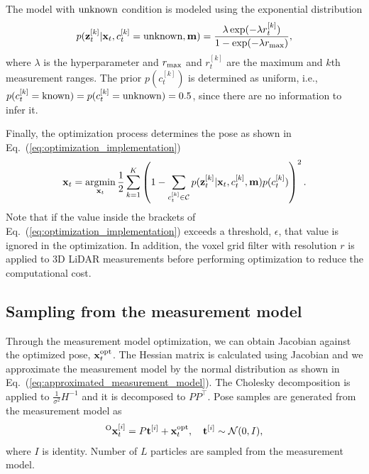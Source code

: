 \documentclass[letterpaper, 10 pt, conference]{ieeeconf}  %
\newcommand{\argmin}{\mathop{\rm argmin}\limits}
\begin{document}
The model with ${\rm unknown}$ condition is modeled using the exponential distribution
%
\begin{align}
    p({\bf z}_{t}^{[k]} | {\bf x}_{t}, c_{t}^{[k]} = {\rm unknown}, {\bf m}) = \frac{\lambda \exp(-\lambda r_{t}^{[k]})}{1 - \exp(-\lambda r_{\rm max})},
\end{align}
%
where $\lambda$ is the hyperparameter and $r_{\rm max}$ and $r_{t}^{[k]}$ are the maximum and $k$th measurement ranges.
The prior $p(c_{t}^{[k]})$ is determined as uniform, i.e., $p(c_{t}^{[k]} = {\rm known}) = p(c_{t}^{[k]} = {\rm unknown}) = 0.5$, since there are no information to infer it.

Finally, the optimization process determines the pose as shown in Eq.~(\ref{eq:optimization_implementation})
%
\begin{align}
    {\bf x}_{t} = \argmin_{{\bf x}_{t}} \frac{1}{2} \sum_{k=1}^{K} \left( 1 - \sum_{c_{t}^{[k]} \in \mathcal{C}} p({\bf z}_{t}^{[k]} | {\bf x}_{t}, c_{t}^{[k]}, {\bf m}) p(c_{t}^{[k]}) \right)^{2}.
    \label{eq:optimization_implementation}
\end{align}
%
Note that if the value inside the brackets of Eq.~(\ref{eq:optimization_implementation}) exceeds a threshold, $\epsilon$, that value is ignored in the optimization.
In addition, the voxel grid filter with resolution $r$ is applied to 3D LiDAR measurements before performing optimization to reduce the computational cost.



\subsection{Sampling from the measurement model}

Through the measurement model optimization, we can obtain Jacobian against the optimized pose, ${\bf x}_{t}^{{\rm opt}}$.
The Hessian matrix is calculated using Jacobian and we approximate the measurement model by the normal distribution as shown in Eq.~(\ref{eq:approximated_measurement_model}).
The Cholesky decomposition is applied to $\frac{1}{\sigma^{2}}H^{-1}$ and it is decomposed to $PP^{\top}$.
Pose samples are generated from the measurement model as
%
\begin{align}
    {}^{\rm O}{\bf x}_{t}^{[i]} = P {\bf t}^{[i]} + {\bf x}_{t}^{{\rm opt}}, ~~~ {\bf t}^{[i]} \sim \mathcal{N}(0, I),
    \label{eq:opt_particle_pose}
\end{align}
%
where $I$ is identity.
Number of $L$ particles are sampled from the measurement model.
\end{document}
